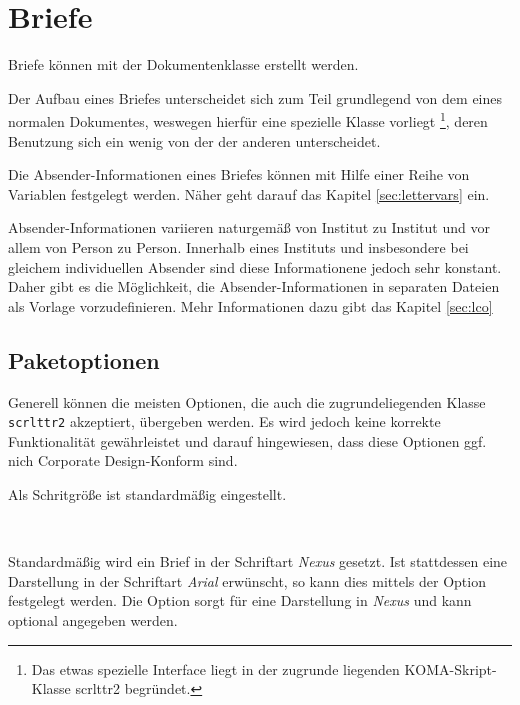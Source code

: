 \chapter{Briefe}

Briefe können mit der Dokumentenklasse  erstellt
werden.

Der Aufbau eines Briefes unterscheidet sich zum Teil grundlegend von dem eines
normalen Dokumentes, weswegen hierfür eine spezielle Klasse vorliegt%
\footnote{Das etwas spezielle Interface liegt in der zugrunde liegenden 
KOMA-Skript-Klasse scrlttr2 begründet.}, deren Benutzung sich ein wenig von
der der anderen unterscheidet.

Die Absender-Informationen eines Briefes können mit Hilfe einer Reihe von
Variablen festgelegt werden. Näher geht darauf das Kapitel \ref{sec:lettervars}
ein.

Absender-Informationen variieren naturgemäß von Institut zu Institut
und vor allem von Person zu Person. Innerhalb eines Instituts und insbesondere
bei gleichem individuellen Absender sind diese Informationene jedoch sehr
konstant. Daher gibt es die Möglichkeit, die Absender-Informationen in
separaten Dateien als Vorlage vorzudefinieren. Mehr Informationen dazu gibt
das Kapitel \ref{sec:lco}

\section{Paketoptionen}

Generell können die meisten Optionen, die auch die zugrundeliegenden Klasse
\texttt{scrlttr2} akzeptiert, übergeben werden. Es wird jedoch keine korrekte
Funktionalität gewährleistet und darauf hingewiesen, dass diese Optionen
ggf. nich Corporate Design-Konform sind.

Als Schritgröße ist standardmäßig \PValue{10pt} eingestellt.

\begin{Declaration}
  \\
\end{Declaration}

Standardmäßig wird ein Brief in der Schriftart \emph{Nexus} gesetzt.
Ist stattdessen eine Darstellung in der Schriftart \emph{Arial} erwünscht,
so kann dies mittels der Option  festgelegt werden.
Die Option  sorgt für eine Darstellung in \emph{Nexus} und
kann optional angegeben werden.

\begin{Declaration}
\end{Declaration}

